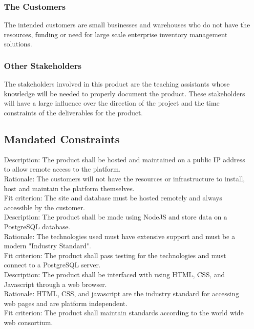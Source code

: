 \documentclass[12pt, titlepage]{article}
\begin{document}
\subsubsection{The Customers}
\noindent
The intended customers are small businesses and warehouses who do not have the resources, funding or need for large scale enterprise inventory management solutions. %

\subsubsection{Other Stakeholders}
The stakeholders involved in this product are the teaching assistants whose knowledge will be needed to properly document the product. These stakeholders will have a large influence over the direction of the project and the time constraints of the deliverables for the product.
\subsection{Mandated Constraints} %
\noindent
Description: The product shall be hosted and maintained on a public IP address to allow remote access to the platform.\\
Rationale: The customers will not have the resources or infrastructure to install, host and maintain the platform themselves.\\
Fit criterion: The site and database must be hosted remotely and always accessible by the customer.\\

\noindent
Description: The product shall be made using NodeJS and store data on a PostgreSQL database.\\
Rationale: The technologies used must have extensive support and must be a modern "Industry Standard".\\
Fit criterion: The product shall pass testing for the technologies and must connect to a PostgreSQL server.\\

\noindent
Description: The product shall be interfaced with using HTML, CSS, and Javascript through a web browser.\\
Rationale: HTML, CSS, and javascript are the industry standard for accessing web pages and are platform independent.\\
Fit criterion: The product shall maintain standards according to the world wide web consortium.\\
\end{document}
